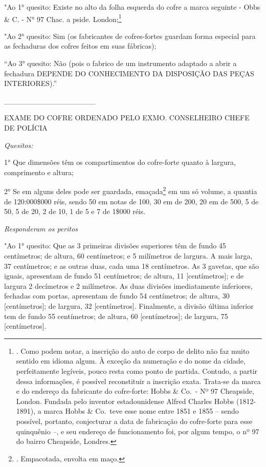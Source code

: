 "Ao 1° quesito: Existe no alto da folha esquerda do cofre a marca
seguinte - Obbs \& C. - N° 97 Chac. a pside. London;\footnote{. Como
  podem notar, a inscrição do auto de corpo de delito não faz muito
  sentido em idioma algum. À exceção da numeração e do nome da cidade,
  perfeitamente legíveis, pouco resta como ponto de partida. Contudo, a
  partir dessa informações, é possível reconstituir a inscrição exata.
  Trata-se da marca e do endereço da fabricante do cofre-forte: Hobbs \&
  Co.~- Nº 97 Cheapside, London. Fundada pelo inventor estadounidense
  Alfred Charles Hobbs (1812-1891), a marca Hobbs \& Co.~teve esse nome
  entre 1851 e 1855 -- sendo possível, portanto, conjecturar a data de
  fabricação do cofre-forte para esse quinquênio --, e seu endereço de
  funcionamento foi, por algum tempo, o nº 97 do bairro Cheapside,
  Londres.}

"Ao 2° quesito: Sim (os fabricantes de cofres-fortes guardam forma
especial para as fechaduras dos cofres feitos em suas fábricas);

``Ao 3° quesito: Não (pois o fabrico de um instrumento adaptado a abrir
a fechadura DEPENDE DO CONHECIMENTO DA DISPOSIÇÃO DAS PEÇAS
INTERIORES).''

\_\_\_\_\_\_\_\_\_\_\_\_\_\_\_\_\_

EXAME DO COFRE ORDENADO PELO EXMO. CONSELHEIRO CHEFE DE POLÍCIA

\emph{Quesitos:}

1° Que dimensões têm os compartimentos do cofre-forte quanto à largura,
comprimento e altura;

2° Se em alguns deles pode ser guardada, emaçada\footnote{. Empacotada,
  envolta em maço.} em um só volume, a quantia de 120:000\$000 réis,
sendo 50 em notas de 100, 30 em de 200, 20 em de 500, 5 de 50, 5 de 20,
2 de 10, 1 de 5 e 7 de 1\$000 réis.

\emph{Responderam os peritos}

"Ao 1° quesito: Que as 3 primeiras divisões superiores têm de fundo 45
centímetros; de altura, 60 centímetros; e 5 milímetros de largura. A
mais larga, 37 centímetros; e as outras duas, cada uma 18 centímetros.
As 3 gavetas, que são iguais, apresentam de fundo 51 centímetros; de
altura, 11 {[}centímetros{]}; e de largura 2 decímetros e 2 milímetros.
As duas divisões imediatamente inferiores, fechadas com portas,
apresentam de fundo 54 centímetros; de altura, 30 {[}centímetros{]}; de
largura, 32 {[}centímetros{]}. Finalmente, a divisão última inferior tem
de fundo 55 centímetros; de altura, 60 {[}centímetros{]}; de largura, 75
{[}centímetros{]}.

